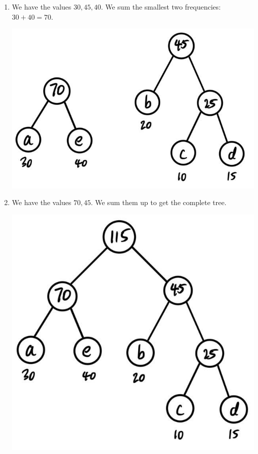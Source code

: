 \documentclass{article}
\begin{document}
\begin{example}
\begin{enumerate}
\begin{center}
        \end{center}
        \item We have the values $30, 45, 40$. We sum the smallest two frequencies: $30 + 40 = 70$. 
        \begin{center}
            \includegraphics[scale=0.3]{img/step_3.jpg}
        \end{center}
        \item We have the values $70, 45$. We sum them up to get the complete tree. 
        \begin{center}
            \includegraphics[scale=0.3]{img/step_4.jpg}
        \end{center}
    \end{enumerate}
    \end{example}
\end{document}
